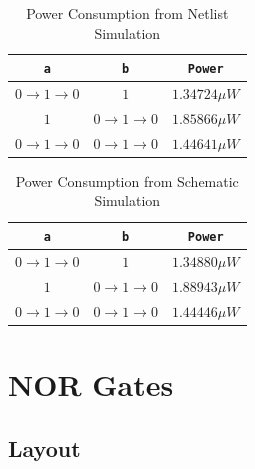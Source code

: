 \documentclass{article}
\begin{document}
	\begin{table}[H]
	\begin{center}
	\caption{Power Consumption from Netlist Simulation}
	\label{table::nand_gate_power_analysis}
	\begin{tabular}{| c | c | c |}
		\hline
		\texttt{a} & \texttt{b} & \texttt{Power}\\
		\hline	
		$0 \rightarrow 1 \rightarrow 0$ & $1$ & $1.34724{\mu}W$ \\
		\hline	
		$1$ & $0 \rightarrow 1 \rightarrow 0$ & $1.85866{\mu}W$ \\
		\hline	
		$0 \rightarrow 1 \rightarrow 0$ & $0 \rightarrow 1 \rightarrow 0$ & $1.44641{\mu}W$\\
		\hline
	\end{tabular}
	\end{center}
	\end{table}
	
	\begin{table}[H]
	\begin{center}
	\caption{Power Consumption from Schematic Simulation}
	\label{table::nand_gate_power_analysis_schem}
	\begin{tabular}{| c | c | c |}
		\hline
		\texttt{a} & \texttt{b} & \texttt{Power}\\
		\hline	
		$0 \rightarrow 1 \rightarrow 0$ & $1$ & $1.34880{\mu}W$ \\
		\hline	
		$1$ & $0 \rightarrow 1 \rightarrow 0$ & $1.88943{\mu}W$ \\
		\hline	
		$0 \rightarrow 1 \rightarrow 0$ & $0 \rightarrow 1 \rightarrow 0$ & $1.44446{\mu}W$\\
		\hline
	\end{tabular}
	\end{center}
	\end{table}
	
	\section{NOR Gates}
	
	\subsection{Layout}
	
\end{document}
